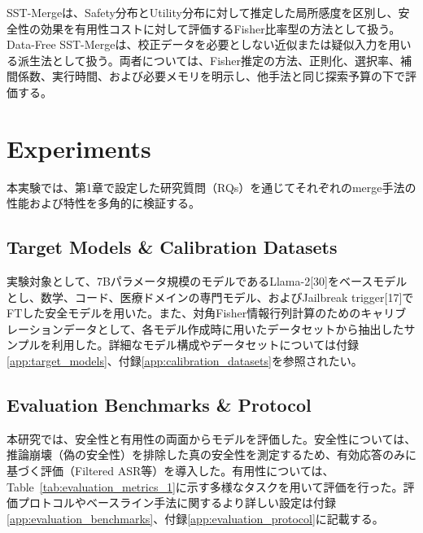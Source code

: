 \documentclass{article}
\begin{document}
SST-Mergeは、Safety分布とUtility分布に対して推定した局所感度を区別し、安全性の効果を有用性コストに対して評価するFisher比率型の方法として扱う。Data-Free SST-Mergeは、校正データを必要としない近似または疑似入力を用いる派生法として扱う。両者については、Fisher推定の方法、正則化、選択率、補間係数、実行時間、および必要メモリを明示し、他手法と同じ探索予算の下で評価する。

\section{Experiments}

本実験では、第1章で設定した研究質問（RQs）を通じてそれぞれのmerge手法の性能および特性を多角的に検証する。

\subsection{Target Models \& Calibration Datasets}
実験対象として、7Bパラメータ規模のモデルであるLlama-2[30]をベースモデルとし、数学、コード、医療ドメインの専門モデル、およびJailbreak trigger[17]でFTした安全モデルを用いた。また、対角Fisher情報行列計算のためのキャリブレーションデータとして、各モデル作成時に用いたデータセットから抽出したサンプルを利用した。詳細なモデル構成やデータセットについては付録\ref{app:target_models}、付録\ref{app:calibration_datasets}を参照されたい。

\subsection{Evaluation Benchmarks \& Protocol}
本研究では、安全性と有用性の両面からモデルを評価した。安全性については、推論崩壊（偽の安全性）を排除した真の安全性を測定するため、有効応答のみに基づく評価（Filtered ASR等）を導入した。有用性については、Table~\ref{tab:evaluation_metrics_1}に示す多様なタスクを用いて評価を行った。評価プロトコルやベースライン手法に関するより詳しい設定は付録\ref{app:evaluation_benchmarks}、付録\ref{app:evaluation_protocol}に記載する。
\end{document}
